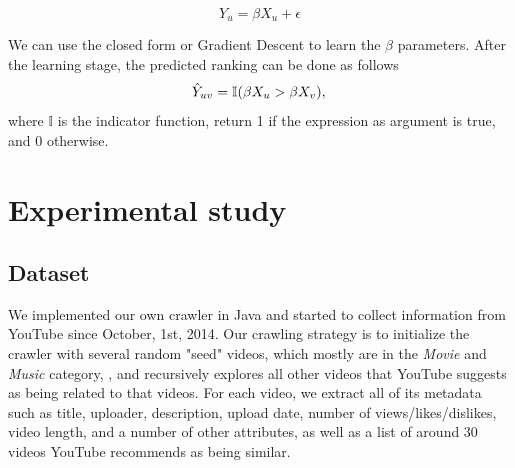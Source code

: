 \documentclass{article} %
\begin{document}
	\begin{equation}
	Y_u = \beta X_u + \epsilon
	\end{equation}
	 
	 We can use the closed form or Gradient Descent to learn the $\beta$ parameters. After the learning stage, the predicted ranking can be done as follows
	 \begin{equation}
	 	\hat{Y}_{uv} = \mathbb{I}(\beta X_u > \beta X_v),\\					
	 \end{equation}
	 where $\mathbb{I}$ is the indicator function, return 1 if the expression as argument is true, and 0 otherwise.
	 



\section{Experimental study}
\label{sec:experiment}

	\subsection{Dataset}
	We implemented our own crawler in Java and started to collect information from YouTube since October, 1st, 2014. Our crawling strategy is to initialize the crawler with several random "seed" videos, which mostly are in the \textit{Movie} and \textit{Music} category, , and recursively explores all other videos that YouTube suggests as being related to that videos. For each video, we extract all of its metadata such as title, uploader, description, upload date, number of views/likes/dislikes, video length, and a number of other attributes, as well as a list of around 30 videos YouTube recommends as being similar. 
\end{document}
